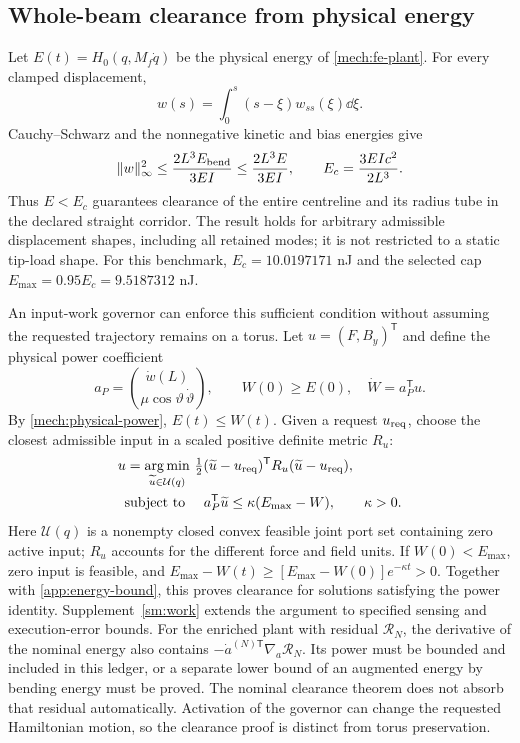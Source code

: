 \subsection{Whole-beam clearance from physical energy}
\label{app:clearance}
Let $E(t)=H_0(q,M_f\dot q)$ be the physical energy of
\eqref{mech:fe-plant}. For every clamped displacement,
\begin{equation}
 w(s)=\int_0^s(s-\xi)w_{ss}(\xi)\dd\xi.
 \label{app:clamped-identity}
\end{equation}
Cauchy--Schwarz and the nonnegative kinetic and bias energies give
\begin{equation}
 \|w\|_\infty^2\le\frac{2L^3E_{\rm bend}}{3EI}
                    \le\frac{2L^3E}{3EI},\qquad
 E_c=\frac{3EIc^2}{2L^3}.
 \label{app:energy-bound}
\end{equation}
Thus $E<E_c$ guarantees clearance of the entire centreline and its
radius tube in the declared straight corridor. The result holds for
arbitrary admissible displacement shapes, including all retained modes;
it is not restricted to a static tip-load shape. For this benchmark,
$E_c=10.0197171$ nJ and the selected cap
$E_{\max}=0.95E_c=9.5187312$ nJ.

An input-work governor can enforce this sufficient condition without
assuming the requested trajectory remains on a torus. Let
$u=(F,B_y)^{\mathsf T}$ and define the physical power coefficient
\begin{equation}
 a_P=\binom{\dot w(L)}{\mu\cos\vartheta\,\dot\vartheta},\qquad
 W(0)\ge E(0),\quad \dot W=a_P^{\mathsf T}u.
 \label{app:work-observer}
\end{equation}
By \eqref{mech:physical-power}, $E(t)\le W(t)$.
Given a request $u_{\rm req}$, choose the closest admissible input in
a scaled positive definite metric $R_u$:
\begin{align}
 u=\mathop{\arg\min}_{\widetilde u\in\mathcal U(q)}
       &\ \tfrac12(\widetilde u-u_{\rm req})^{\mathsf T}
                 R_u(\widetilde u-u_{\rm req}),\nonumber\\
 \text{subject to }&\quad
 a_P^{\mathsf T}\widetilde u\le\kappa(E_{\max}-W),
 \qquad \kappa>0.
 \label{app:work-governor}
\end{align}
Here $\mathcal U(q)$ is a nonempty closed convex feasible joint port set containing zero active
input; $R_u$ accounts for the different force and field units.
If $W(0)<E_{\max}$, zero input is feasible, and
$E_{\max}-W(t)\ge[E_{\max}-W(0)]e^{-\kappa t}>0$.
Together with \eqref{app:energy-bound}, this proves clearance for
solutions satisfying the power identity. Supplement~\ref{sm:work}
extends the argument to specified sensing and execution-error bounds.
For the enriched plant with residual $\mathcal R_N$, the derivative
of the nominal energy also contains
$-\dot a^{(N)\mathsf T}\nabla_a\mathcal R_N$. Its power must be
bounded and included in this ledger, or a separate lower bound of an
augmented energy by bending energy must be proved. The nominal
clearance theorem does not absorb that residual automatically. Activation of the governor can change the requested
Hamiltonian motion, so the clearance proof is distinct from torus
preservation.

